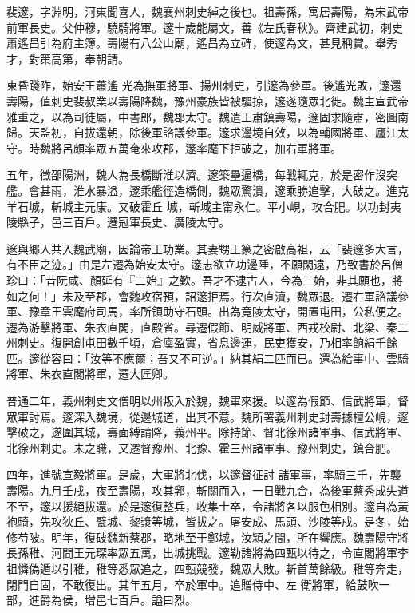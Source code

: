 
\begin{pinyinscope}

 裴邃，字淵明，河東聞喜人，魏襄州刺史綽之後也。祖壽孫，寓居壽陽，為宋武帝前軍長史。父仲穆，驍騎將軍。邃十歲能屬文，善《左氏春秋》。齊建武初，刺史蕭遙昌引為府主簿。壽陽有八公山廟，遙昌為立碑，使邃為文，甚見稱賞。舉秀才，對策高第，奉朝請。



 東昏踐阼，始安王蕭遙
 光為撫軍將軍、揚州刺史，引邃為參軍。後遙光敗，邃還壽陽，值刺史裴叔業以壽陽降魏，豫州豪族皆被驅掠，邃遂隨眾北徙。魏主宣武帝雅重之，以為司徒屬，中書郎，魏郡太守。魏遣王肅鎮壽陽，邃固求隨肅，密圖南歸。天監初，自拔還朝，除後軍諮議參軍。邃求邊境自效，以為輔國將軍、廬江太守。時魏將呂頗率眾五萬奄來攻郡，邃率麾下拒破之，加右軍將軍。



 五年，徵邵陽洲，魏人為長橋斷淮以濟。邃築壘逼橋，每戰輒克，於是密作沒突艦。會甚雨，淮水暴溢，邃乘艦徑造橋側，魏眾驚潰，邃乘勝追擊，大破之。進克羊石城，斬城主元康。又破霍丘
 城，斬城主甯永仁。平小峴，攻合肥。以功封夷陵縣子，邑三百戶。遷冠軍長史、廣陵太守。



 邃與鄉人共入魏武廟，因論帝王功業。其妻甥王篆之密啟高祖，云「裴邃多大言，有不臣之迹。」由是左遷為始安太守。邃志欲立功邊陲，不願閑遠，乃致書於呂僧珍曰：「昔阮咸、顏延有『二始』之歎。吾才不逮古人，今為三始，非其願也，將如之何！」未及至郡，會魏攻宿預，詔邃拒焉。行次直瀆，魏眾退。遷右軍諮議參軍、豫章王雲麾府司馬，率所領助守石頭。出為竟陵太守，開置屯田，公私便之。遷為游擊將軍、朱衣直閣，直殿省。尋遷假節、明威將軍、西戎校尉、北梁、秦二
 州刺史。復開創屯田數千頃，倉廩盈實，省息邊運，民吏獲安，乃相率餉絹千餘匹。邃從容曰：「汝等不應爾；吾又不可逆。」納其絹二匹而已。還為給事中、雲騎將軍、朱衣直閣將軍，遷大匠卿。



 普通二年，義州刺史文僧明以州叛入於魏，魏軍來援。以邃為假節、信武將軍，督眾軍討焉。邃深入魏境，從邊城道，出其不意。魏所署義州刺史封壽據檀公峴，邃擊破之，遂圍其城，壽面縛請降，義州平。除持節、督北徐州諸軍事、信武將軍、北徐州刺史。未之職，又遷督豫州、北豫、霍三州諸軍事、豫州刺史，鎮合肥。



 四年，進號宣毅將軍。是歲，大軍將北伐，以邃督征討
 諸軍事，率騎三千，先襲壽陽。九月壬戌，夜至壽陽，攻其郛，斬關而入，一日戰九合，為後軍蔡秀成失道不至，邃以援絕拔還。於是邃復整兵，收集士卒，令諸將各以服色相別。邃自為黃袍騎，先攻狄丘、甓城、黎漿等城，皆拔之。屠安成、馬頭、沙陵等戍。是冬，始修芍陂。明年，復破魏新蔡郡，略地至于鄭城，汝潁之間，所在響應。魏壽陽守將長孫稚、河間王元琛率眾五萬，出城挑戰。邃勒諸將為四甄以待之，令直閣將軍李祖憐偽遁以引稚，稚等悉眾追之，四甄競發，魏眾大敗。斬首萬餘級。稚等奔走，閉門自固，不敢復出。其年五月，卒於軍中。追贈侍中、左
 衛將軍，給鼓吹一部，進爵為侯，增邑七百戶。謚曰烈。




\end{pinyinscope}
